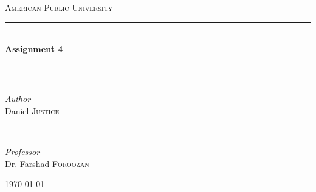 \documentclass[11pt]{article}
\begin{document}

\begin{titlepage} %
	\newcommand{\HRule}{\rule{\linewidth}{0.5mm}} %

	\center %


	\textsc{\LARGE American Public University}\\[1.5cm] %


	\HRule\\[0.4cm]

	{\huge\bfseries Assignment 4}\\[0.4cm] %

	\HRule\\[1.5cm]


	\begin{minipage}{0.4\textwidth}
		\begin{flushleft}
			\large
			\textit{Author}\\
			Daniel \textsc{Justice} %
		\end{flushleft}
	\end{minipage}
	~
	\begin{minipage}{0.4\textwidth}
		\begin{flushright}
			\large
			\textit{Professor}\\
			Dr. Farshad \textsc{Foroozan} %
		\end{flushright}
	\end{minipage}


	\vfill\vfill\vfill
	{\large\today} %
	\vfill

\end{titlepage}
\end{document}
